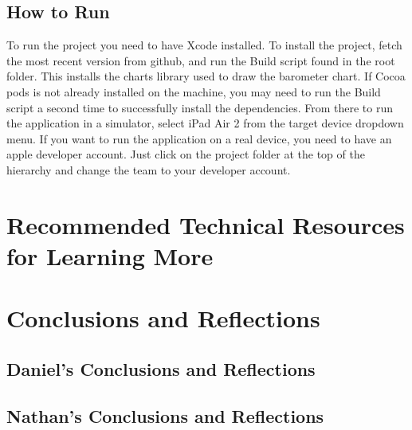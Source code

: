 \documentclass[onecolumn, draftclsnofoot,10pt, compsoc]{IEEEtran}
\begin{document}
\subsection{How to Run}
To run the project you need to have Xcode installed.
To install the project, fetch the most recent version from github, and run the Build script found in the root folder.
This installs the charts library used to draw the barometer chart.
If Cocoa pods is not already installed on the machine, you may need to run the Build script a second time to successfully install the dependencies.
From there to run the application in a simulator, select iPad Air 2 from the target device dropdown menu.
If you want to run the application on a real device, you need to have an apple developer account.
Just click on the project folder at the top of the hierarchy and change the team to your developer account.

\section{Recommended Technical Resources for Learning More}

\section{Conclusions and Reflections}

\subsection{Daniel's Conclusions and Reflections}

\subsection{Nathan's Conclusions and Reflections}
\end{document}
